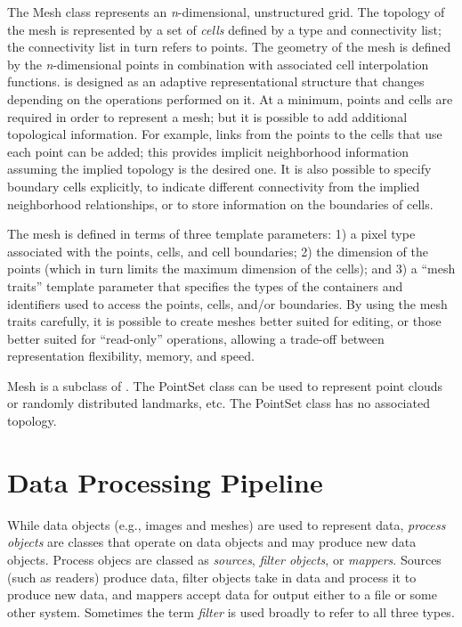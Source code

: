 
The Mesh class represents an \emph{n}-dimensional, unstructured grid. The
topology of the mesh is represented by a set of \emph{cells} defined by a 
type and
connectivity list; the connectivity list in turn refers to points.  The
geometry of the mesh is defined by the \emph{n}-dimensional points in
combination with associated cell interpolation functions.  is
designed as an adaptive representational structure that changes depending on
the operations performed on it. At a minimum, points and cells are required
in order to represent a mesh; but it is possible to add additional topological
information.  For example, links from the points to the cells that use each
point can be added; this provides implicit neighborhood information assuming
the implied topology is the desired one. It is also possible to
specify boundary cells explicitly, to indicate different connectivity
from the implied neighborhood relationships, or to store information
on the boundaries of cells. 

The mesh is defined in terms of three template parameters: 1) a pixel type
associated with the points, cells, and cell boundaries; 2) the dimension of
the points (which in turn limits the maximum dimension of the cells); and 3)
a ``mesh traits'' template parameter that specifies the types of the
containers and identifiers used to access the points, cells, and/or
boundaries. By using the mesh traits carefully, it is possible to create
meshes better suited for editing, or those better suited for ``read-only''
operations, allowing a trade-off between representation flexibility, memory,
and speed.

Mesh is a subclass of . The PointSet
class can be used to represent point clouds or randomly distributed
landmarks, etc. The PointSet class has no associated topology.


\section{Data Processing Pipeline}
\label{sec:DataProcessingPipeline}



While data objects (e.g., images and meshes) are used to represent data,
\emph{process objects} are classes that operate on data objects and may
produce new data objects. Process objecs are classed as
\emph{sources}, \emph{filter objects}, or \emph{mappers}.  Sources (such as
readers) produce data, filter objects take in data and process it to produce
new data, and mappers accept data for output either to a file or
some other system.  Sometimes the term \emph{filter} is used broadly
to refer to all three types.

